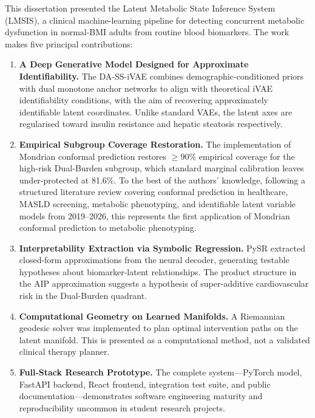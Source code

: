 \documentclass[12pt,a4paper,oneside]{report}
\newcommand{\daivae}{DA-SS-iVAE}
\begin{document}
This dissertation presented the Latent Metabolic State Inference System (LMSIS), a clinical machine-learning pipeline for detecting concurrent metabolic dysfunction in normal-BMI adults from routine blood biomarkers. The work makes five principal contributions:

\begin{enumerate}[leftmargin=*]
    \item \textbf{A Deep Generative Model Designed for Approximate Identifiability.} The \daivae{} combines demographic-conditioned priors \citep{khemakhem2020} with dual monotone anchor networks to align with theoretical iVAE identifiability conditions, with the aim of recovering approximately identifiable latent coordinates. Unlike standard VAEs, the latent axes are regularised toward insulin resistance and hepatic steatosis respectively.

    \item \textbf{Empirical Subgroup Coverage Restoration.} The implementation of Mondrian conformal prediction restores $\geq 90\%$ empirical coverage for the high-risk Dual-Burden subgroup, which standard marginal calibration leaves under-protected at 81.6\%. To the best of the authors' knowledge, following a structured literature review covering conformal prediction in healthcare, MASLD screening, metabolic phenotyping, and identifiable latent variable models from 2019--2026, this represents the first application of Mondrian conformal prediction to metabolic phenotyping.

    \item \textbf{Interpretability Extraction via Symbolic Regression.} PySR extracted closed-form approximations from the neural decoder, generating testable hypotheses about biomarker-latent relationships. The product structure in the AIP approximation suggests a hypothesis of super-additive cardiovascular risk in the Dual-Burden quadrant.

    \item \textbf{Computational Geometry on Learned Manifolds.} A Riemannian geodesic solver was implemented to plan optimal intervention paths on the latent manifold. This is presented as a computational method, not a validated clinical therapy planner.

    \item \textbf{Full-Stack Research Prototype.} The complete system---PyTorch model, FastAPI backend, React frontend, integration test suite, and public documentation---demonstrates software engineering maturity and reproducibility uncommon in student research projects.
\end{enumerate}
\end{document}
